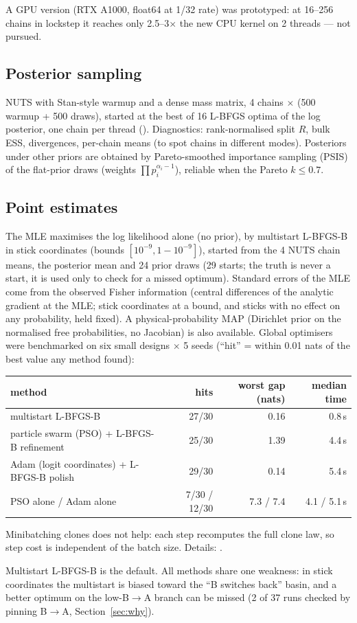 \documentclass[10pt,a4paper]{article}
\newcommand{\BA}{B$\to$A}
\begin{document}
A GPU version (RTX A1000, float64 at 1/32 rate) was prototyped: at 16--256 chains in lockstep it reaches only 2.5--3$\times$ the new CPU kernel on 2 threads --- not pursued.

\subsection{Posterior sampling}
NUTS with Stan-style warmup and a dense mass matrix, 4 chains $\times$ (500 warmup + 500 draws), started at the best of 16 L-BFGS optima of the log posterior, one chain per thread (). Diagnostics: rank-normalised split $\hat R$, bulk ESS, divergences, per-chain means (to spot chains in different modes). Posteriors under other priors are obtained by Pareto-smoothed importance sampling (PSIS) of the flat-prior draws (weights $\prod p_i^{\alpha_i - 1}$), reliable when the Pareto $k \le 0.7$.

\subsection{Point estimates}
The MLE maximises the log likelihood alone (no prior), by multistart L-BFGS-B in stick coordinates (bounds $[10^{-9}, 1-10^{-9}]$), started from the 4 NUTS chain means, the posterior mean and 24 prior draws (29 starts; the truth is never a start, it is used only to check for a missed optimum). Standard errors of the MLE come from the observed Fisher information (central differences of the analytic gradient at the MLE; stick coordinates at a bound, and sticks with no effect on any probability, held fixed). A physical-probability MAP (Dirichlet prior on the normalised free probabilities, no Jacobian) is also available. Global optimisers were benchmarked on six small designs $\times$ 5 seeds (``hit'' = within 0.01 nats of the best value any method found):
\begin{center}\footnotesize
\begin{tabular}{@{}lrrr@{}}\toprule
method & hits & worst gap (nats) & median time \\\midrule
multistart L-BFGS-B & 27/30 & 0.16 & 0.8\,s \\
particle swarm (PSO) + L-BFGS-B refinement & 25/30 & 1.39 & 4.4\,s \\
Adam (logit coordinates) + L-BFGS-B polish & 29/30 & 0.14 & 5.4\,s \\
PSO alone / Adam alone & 7/30 / 12/30 & 7.3 / 7.4 & 4.1 / 5.1\,s \\\bottomrule
\end{tabular}

Minibatching clones does not help: each step recomputes the full clone law, so step cost is independent of the batch size. Details: .
\end{center}
Multistart L-BFGS-B is the default. All methods share one weakness: in stick coordinates the multistart is biased toward the ``B switches back'' basin, and a better optimum on the low-\BA{} branch can be missed (2 of 37 runs checked by pinning \BA, Section~\ref{sec:why}).
\end{document}
